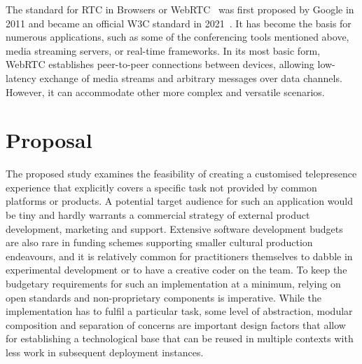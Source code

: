 The standard for \ac{RTC} in Browsers or \ac{WebRTC}~\parencite{webRtcSpec} was first proposed by Google in 2011 and became an official \ac{W3C} standard in 2021~\parencite{webRtcOfficialWebStandard}.
It has become the basis for numerous applications, such as some of the conferencing tools mentioned above, media streaming servers, or real-time frameworks.
In its most basic form, \ac{WebRTC} establishes peer-to-peer connections between devices, allowing low-latency exchange of media streams and arbitrary messages over data channels.
However, it can accommodate other more complex and versatile scenarios.

\section{Proposal}
\label{sec:proposal}

The proposed study examines the feasibility of creating a customised telepresence experience that explicitly covers a specific task not provided by common platforms or products.
A potential target audience for such an application would be tiny and hardly warrants a commercial strategy of external product development, marketing and support.
Extensive software development budgets are also rare in funding schemes supporting smaller cultural production endeavours, and it is relatively common for practitioners themselves to dabble in experimental development or to have a creative coder on the team.
To keep the budgetary requirements for such an implementation at a minimum, relying on open standards and non-proprietary components is imperative.
While the implementation has to fulfil a particular task, some level of abstraction, modular composition and separation of concerns are important design factors that allow for establishing a technological base that can be reused in multiple contexts with less work in subsequent deployment instances.

